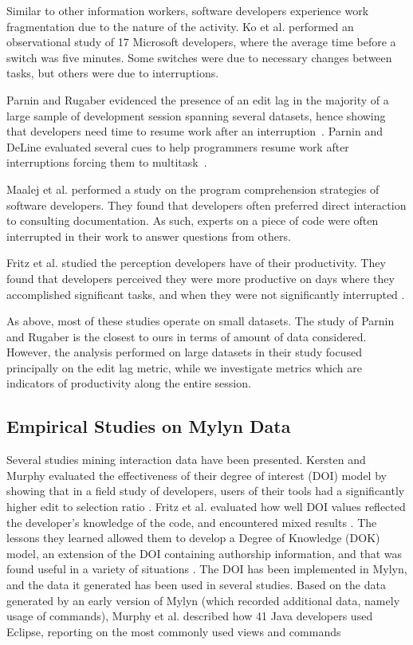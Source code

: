 \documentclass[times]{smrauth}
\begin{document}
Similar to other information workers, software developers experience work fragmentation due to the nature of the activity. Ko et al. \cite{KDV07} performed an observational study of 17 Microsoft developers, where the average time before a switch was five minutes. Some switches were due to necessary changes between tasks, but others were due to interruptions. 

Parnin and Rugaber evidenced the presence of an edit lag in the majority of a large sample of development session spanning several datasets, hence showing that developers need time to resume work after an interruption~\cite{PR11}. Parnin and DeLine evaluated several cues  to help programmers resume work after interruptions forcing them to multitask~\cite{PD10}.

Maalej et al. \cite{MTRK14} performed a study on the program comprehension strategies of software developers. They found that developers often preferred direct interaction to consulting documentation. As such, experts on a piece of code were often interrupted in their work to answer questions from others.

Fritz et al. studied the perception developers have of their productivity. They found that developers perceived they were more productive on days where they accomplished significant tasks, and when they were not significantly interrupted \cite{MFMZ14}.

As above, most of these studies operate on small datasets. The study of Parnin and Rugaber is the closest to ours in terms of amount of data considered. However, the analysis performed on large datasets in their study focused principally on the edit lag metric, while we investigate metrics which are indicators of productivity along the entire session.


\subsection{Empirical Studies on Mylyn Data}

Several studies mining interaction data have been presented. Kersten and Murphy evaluated the effectiveness of their degree of interest (DOI) model by showing that in a field study of developers, users of their tools had a significantly higher edit to selection ratio \cite{KM06}. Fritz et al. evaluated how well DOI values reflected the developer's knowledge of the code, and encountered mixed results \cite{FMH07}. The lessons they learned allowed them to develop a Degree of Knowledge (DOK) model, an extension of the DOI containing authorship information, and that was found useful in a variety of situations \cite{FOMM10}. The DOI has been implemented in Mylyn, and the data it generated has been used in several studies. Based on the data generated by an early version of Mylyn (which recorded additional data, namely usage of commands), Murphy et al. described how 41 Java developers used Eclipse, reporting on the most commonly used views and commands \cite{MKF06}
\end{document}
